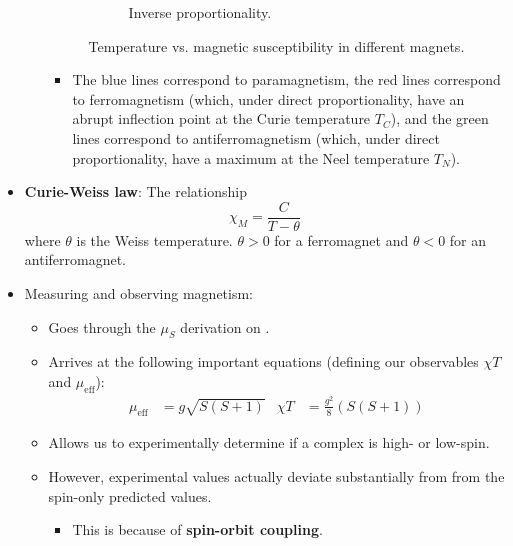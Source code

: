 \documentclass[../notes.tex]{subfiles}
\begin{document}
\begin{itemize}
\begin{itemize}
\begin{figure}[h!]
\begin{subfigure}[b]{0.4\linewidth}
                \caption{Inverse proportionality.}
                \label{fig:tempMagneticSusceptibilityb}
            \end{subfigure}
            \caption{Temperature vs. magnetic susceptibility in different magnets.}
            \label{fig:tempMagneticSusceptibility}
        \end{figure}
        \begin{itemize}
            \item The blue lines correspond to paramagnetism, the red lines correspond to ferromagnetism (which, under direct proportionality, have an abrupt inflection point at the Curie temperature $T_C$), and the green lines correspond to antiferromagnetism (which, under direct proportionality, have a maximum at the Neel temperature $T_N$).
        \end{itemize}
    \end{itemize}
    \item \textbf{Curie-Weiss law}: The relationship
    \begin{equation*}
        \chi_M = \frac{C}{T-\theta}
    \end{equation*}
    where $\theta$ is the Weiss temperature. $\theta>0$ for a ferromagnet and $\theta<0$ for an antiferromagnet.
    \item Measuring and observing magnetism:
    \begin{itemize}
        \item Goes through the $\mu_S$ derivation on \textcite[119]{bib:CHEM20100Notes}.
        \item Arrives at the following important equations (defining our observables $\chi T$ and $\mu_\text{eff}$):
        \begin{align*}
            \mu_\text{eff} &= g\sqrt{S(S+1)}&
            \chi T &= \frac{g^2}{8}(S(S+1))
        \end{align*}
        \item Allows us to experimentally determine if a complex is high- or low-spin.
        \item However, experimental values actually deviate substantially from from the spin-only predicted values.
        \begin{itemize}
            \item This is because of \textbf{spin-orbit coupling}.

\end{itemize}
\end{itemize}
\end{itemize}
\end{document}
